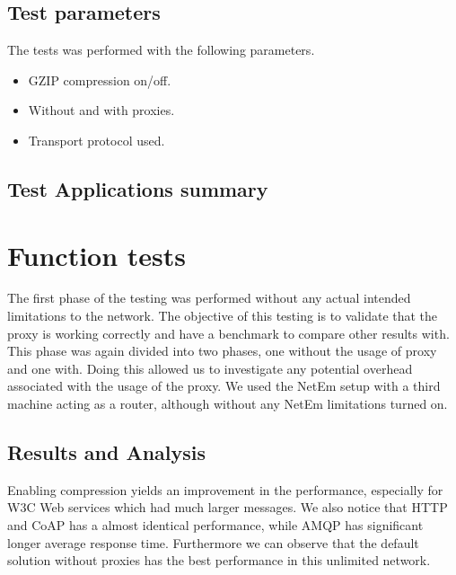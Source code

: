 \subsection{Test parameters}

The tests was performed with the following parameters.

\begin{itemize}
	\item GZIP compression on/off.
	\item Without and with proxies.
    \item Transport protocol used.
\end{itemize}

\subsection{Test Applications summary}


\section{Function tests}

The first phase of the testing was performed without any actual intended
limitations to the network. The objective of this testing is to validate that
the proxy is working correctly and have a benchmark to compare other results
with. This phase was again divided into two phases, one without the usage of
proxy and one with. Doing this allowed us to investigate any potential
overhead associated with the usage of the proxy. We used the NetEm setup with
a third machine acting as a router, although without any NetEm limitations
turned on.


\subsection{Results and Analysis}

Enabling compression yields an improvement in the performance, especially for
W3C Web services which had much larger messages. We also notice that HTTP and
CoAP has a almost identical performance, while AMQP has significant longer
average response time. Furthermore we can observe that the default solution
without proxies has the best performance in this unlimited network.

